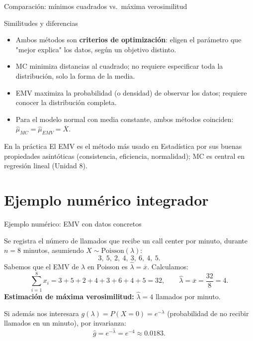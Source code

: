 \documentclass[aspectratio=169,11pt]{beamer}
\begin{document}
\begin{frame}{Comparación: mínimos cuadrados vs.\ máxima verosimilitud}
\begin{block}{Similitudes y diferencias}
\begin{itemize}
\item Ambos métodos son \textbf{criterios de optimización}: eligen el parámetro que "mejor explica" los datos, según un objetivo distinto.
\item MC minimiza distancias al cuadrado; no requiere especificar toda la distribución, solo la forma de la media.
\item EMV maximiza la probabilidad (o densidad) de observar los datos; requiere conocer la distribución completa.
\item Para el modelo normal con media constante, ambos métodos coinciden: $\widehat\mu_{MC} = \widehat\mu_{EMV} = \overline X$.
\end{itemize}
\end{block}
\begin{alertblock}{En la práctica}
El EMV es el método más usado en Estadística por sus buenas propiedades asintóticas (consistencia, eficiencia, normalidad); MC es central en regresión lineal (Unidad 8).
\end{alertblock}
\end{frame}

\section{Ejemplo numérico integrador}

\begin{frame}{Ejemplo numérico: EMV con datos concretos}
\begin{example}
Se registra el número de llamados que recibe un call center por minuto, durante $n=8$ minutos, asumiendo $X\sim\text{Poisson}(\lambda)$:
\[
3,\ 5,\ 2,\ 4,\ 3,\ 6,\ 4,\ 5.
\]
Sabemos que el EMV de $\lambda$ en Poisson es $\widehat\lambda = \overline x$. Calculamos:
\[
\sum_{i=1}^8 x_i = 3+5+2+4+3+6+4+5 = 32, \qquad \widehat\lambda = \overline x = \frac{32}{8} = 4.
\]
\textbf{Estimación de máxima verosimilitud:} $\widehat\lambda = 4$ llamados por minuto.

Si además nos interesara $g(\lambda) = P(X=0) = e^{-\lambda}$ (probabilidad de no recibir llamados en un minuto), por invarianza:
\[
\widehat{g} = e^{-\widehat\lambda} = e^{-4} \approx 0.0183.
\]
\end{example}
\end{frame}
\end{document}
